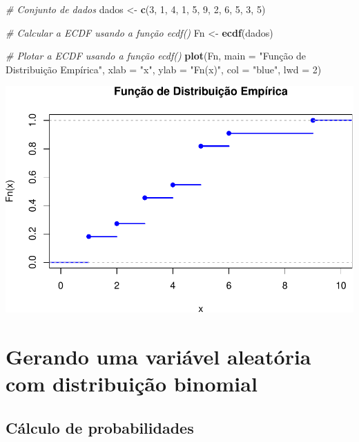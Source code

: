 \documentclass[
]{book}
\newenvironment{Shaded}{\begin{snugshade}}{\end{snugshade}}
\newcommand{\AttributeTok}[1]{\textcolor[rgb]{0.13,0.29,0.53}{#1}}
\newcommand{\CommentTok}[1]{\textcolor[rgb]{0.56,0.35,0.01}{\textit{#1}}}
\newcommand{\DecValTok}[1]{\textcolor[rgb]{0.00,0.00,0.81}{#1}}
\newcommand{\FunctionTok}[1]{\textcolor[rgb]{0.13,0.29,0.53}{\textbf{#1}}}
\newcommand{\NormalTok}[1]{#1}
\newcommand{\OtherTok}[1]{\textcolor[rgb]{0.56,0.35,0.01}{#1}}
\newcommand{\StringTok}[1]{\textcolor[rgb]{0.31,0.60,0.02}{#1}}
\theoremstyle{definition}
\theoremstyle{definition}
\theoremstyle{definition}
\theoremstyle{definition}
\theoremstyle{remark}
\begin{document}
\begin{Shaded}
\begin{Highlighting}[]
\CommentTok{\# Conjunto de dados}
\NormalTok{dados }\OtherTok{\textless{}{-}} \FunctionTok{c}\NormalTok{(}\DecValTok{3}\NormalTok{, }\DecValTok{1}\NormalTok{, }\DecValTok{4}\NormalTok{, }\DecValTok{1}\NormalTok{, }\DecValTok{5}\NormalTok{, }\DecValTok{9}\NormalTok{, }\DecValTok{2}\NormalTok{, }\DecValTok{6}\NormalTok{, }\DecValTok{5}\NormalTok{, }\DecValTok{3}\NormalTok{, }\DecValTok{5}\NormalTok{)}

\CommentTok{\# Calcular a ECDF usando a função ecdf()}
\NormalTok{Fn }\OtherTok{\textless{}{-}} \FunctionTok{ecdf}\NormalTok{(dados)}

\CommentTok{\# Plotar a ECDF usando a função ecdf()}
\FunctionTok{plot}\NormalTok{(Fn, }\AttributeTok{main =} \StringTok{"Função de Distribuição Empírica"}\NormalTok{, }\AttributeTok{xlab =} \StringTok{"x"}\NormalTok{, }\AttributeTok{ylab =} \StringTok{"Fn(x)"}\NormalTok{, }\AttributeTok{col =} \StringTok{"blue"}\NormalTok{, }\AttributeTok{lwd =} \DecValTok{2}\NormalTok{)}
\end{Highlighting}
\end{Shaded}

\includegraphics{meuLivro2_files/figure-latex/unnamed-chunk-107-1.pdf}

\section{Gerando uma variável aleatória com distribuição binomial}\label{gerando-uma-variuxe1vel-aleatuxf3ria-com-distribuiuxe7uxe3o-binomial}

\subsection{Cálculo de probabilidades}\label{cuxe1lculo-de-probabilidades}
\end{document}
